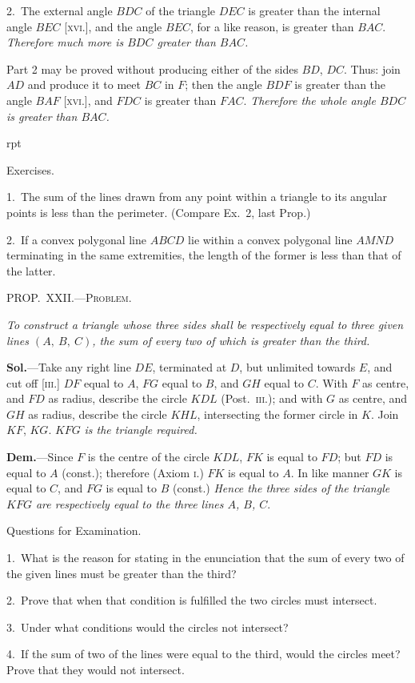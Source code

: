 \documentclass[oneside]{book}
\newcommand\mypropl[2]{
\bigskip\Needspace*{4\baselineskip}\begin{center}\textsc{#1}\end{center}
\hspace{\parindent}\emph{#2}\par\medskip
}
\newcommand\exhead[1]{
\Needspace*{5\baselineskip}\begin{center}
\textsf{#1}
\end{center}
}
\newcommand\exheadin[1]{
\par\medskip\Needspace*{4\baselineskip}
\hspace{1.5\parindent}\textsf{#1}\par\medskip
}
\newcommand\imgflow[3]{
\setcounter{wrapwidth}{#1}
\begin{wrapfigure}[#2]{r}{\value{wrapwidth}pt}
\begin{center}
\vspace{-0.3in}
\end{center}
\end{wrapfigure}
}
\newcommand\imgcent[2]{
\begin{center}
\end{center}
}
\begin{document}
2.~The external angle $BDC$ of the triangle $DEC$ is
greater than the internal angle $BEC$ [\textsc{xvi}.], and the angle
$BEC$, for a like reason, is greater than $BAC$. \emph{Therefore
much more is $BDC$ greater than $BAC$.}

Part 2 may be proved without producing either of
the sides $BD$, $DC$. Thus: join $AD$ and produce it to
meet $BC$ in $F$; then the angle $BDF$ is greater than
the angle $BAF$ [\textsc{xvi}.], and $FDC$ is greater than $FAC$.
\emph{Therefore the whole angle $BDC$ is greater than $BAC$.}

\imgflow{138}{8}{f038}

\exheadin{Exercises.}

\begin{footnotesize}
1.~The sum of the lines drawn from any point within a triangle
to its angular points is less than
the perimeter. (Compare Ex.~2,
last Prop.)

2.~If a convex polygonal line
$ABCD$ lie within a convex polygonal
line $AMND$ terminating in
the same extremities, the length of
the former is less than that of the
latter.

\par\end{footnotesize}


\mypropl{PROP\@.~XXII\@.---Problem.}{To construct a triangle whose three sides shall be respectively
equal to three given lines $(A,\ B,\ C)$, the sum of every
two of which is greater than the third.}

\textbf{Sol.}---Take any right line $DE$, terminated at $D$, but
unlimited towards $E$, and cut off [\textsc{iii}.] $DF$ equal to $A$,
$FG$ equal to $B$, and $GH$ equal to $C$. With $F$ as centre,
and $FD$ as radius, describe the circle $KDL$ (Post.~\textsc{iii}.);
and with $G$ as centre, and $GH$ as radius, describe the
circle $KHL$, intersecting the former circle in $K$. Join
$KF$, $KG$. $KFG$ \emph{is the triangle required.}

\imgcent{290}{f039}

\textbf{Dem.}---Since $F$ is the centre of the circle $KDL$, $FK$
is equal to $FD$; but $FD$ is equal to $A$ (const.); therefore
(Axiom \textsc{i}.) $FK$ is equal to $A$. In like manner $GK$
is equal to $C$, and $FG$ is equal to $B$ (const.) \textit{Hence
the three sides of the triangle $KFG$ are respectively equal
to the three lines $A$, $B$, $C$}.

\exhead{Questions for Examination.}

\begin{footnotesize}
1.~What is the reason for stating in the enunciation that the
sum of every two of the given lines must be greater than the
third?

2.~Prove that when that condition is fulfilled the two circles
must intersect.

3.~Under what conditions would the circles not intersect?

4.~If the sum of two of the lines were equal to the third, would
the circles meet? Prove that they would not intersect.
\par\end{footnotesize}
\end{document}

